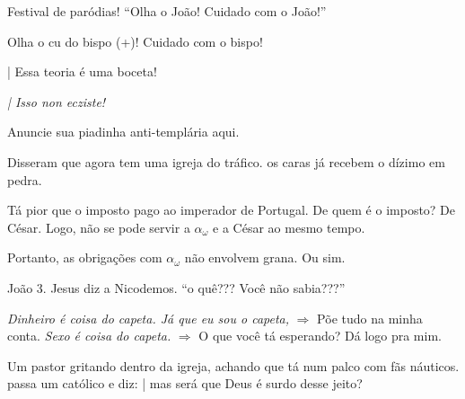 \documentclass[12pt,a4paper]{article}
\begin{document}
		\begin{flushright}
		\end{flushright}

		Festival de par\'odias! \textquotedblleft Olha o Jo\~ao! Cuidado com o Jo\~ao!\textquotedblright

		Olha o cu do bispo (+)! Cuidado com o bispo! %

		\begin{flushright}
		\end{flushright}

		| Essa teoria \'e uma boceta!

		\emph{| Isso non ecziste!}\cite{quevedo}

		\begin{flushright}
		\end{flushright}

		Anuncie sua piadinha anti-templ\'aria aqui.

		\begin{flushright}
		\end{flushright}

		Disseram que agora tem uma igreja\cite{x} do tr\'afico. os caras j\'a recebem o d\'izimo em pedra.

		T\'a pior que o imposto pago ao imperador de Portugal. De quem \'e o imposto? De C\'esar\cite{x}. Logo, n\~ao se pode servir a $ \alpha_\omega $ e a C\'esar ao mesmo tempo.

		Portanto, as obriga\c{c}\~oes com $ \alpha_\omega $ n\~ao envolvem grana. Ou sim.

		\begin{flushright}
		\end{flushright}

		Jo\~ao 3. Jesus diz a Nicodemos. \textquotedblleft o qu\^e??? Voc\^e n\~ao sabia???\textquotedblright

		\begin{flushright}
		\end{flushright}

		\emph{Dinheiro \'e coisa do capeta. J\'a que eu sou o capeta,} $\Rightarrow$ P\~oe tudo na minha conta.
		\emph{Sexo \'e coisa do capeta.} $\Rightarrow$ O que voc\^e t\'a esperando? D\'a logo pra mim.

		\begin{flushright}
		\end{flushright}

		Um pastor gritando dentro da igreja, achando que t\'a num palco com f\~as n\'auticos. passa um cat\'olico e diz: | mas ser\'a que Deus \'e surdo desse jeito?
\end{document}
